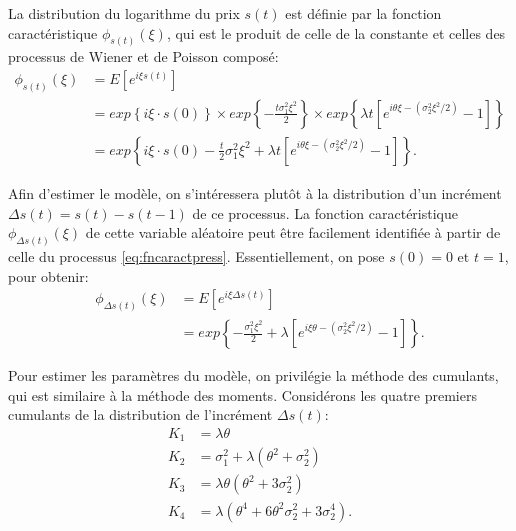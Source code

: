 La distribution du logarithme du prix $s(t)$ est définie par la
fonction caractéristique $\phi_{s(t)}(\xi)$, qui est le produit de
celle de la constante et celles des processus de Wiener et de Poisson
composé:
\begin{align}
  \label{eq:fncaractpress}
  \phi_{s(t)}\left(\xi\right) &= E\left[e^{i \xi s(t)} \right] \nonumber \\
  &= exp\left\{ i\xi \cdot s(0) \right\} \times exp \left\{ -\frac{t \sigma_1^2 \xi^2}{2} \right\} \times exp \left\{ \lambda t \left[e^{i \theta \xi-(\sigma_2^2 \xi^2/2)}-1 \right] \right\} \nonumber \\
  &= exp\left\{ i\xi \cdot s(0)- \frac{t}{2}\sigma_1^2\xi^2 + \lambda
    t \left[e^{i \theta \xi-(\sigma_2^2 \xi^2/2)}-1 \right] \right\}.
\end{align}

Afin d'estimer le modèle, on s'intéressera plutôt à la distribution
d'un incrément $\Delta s(t) = s(t)-s(t-1)$ de ce processus. La
fonction caractéristique $\phi_{\Delta s(t)}(\xi)$ de cette variable
aléatoire peut être facilement identifiée à partir de celle du
processus \eqref{eq:fncaractpress}. Essentiellement, on pose $s(0)=0
\mbox{ et } t=1$, pour obtenir:
\begin{align}
  \label{eq:fncaractpress2}
  \phi_{\Delta s(t)}\left(\xi\right) &= E\left[e^{i\xi\Delta s(t)} \right] \nonumber \\
  &= exp\left\{-\frac{\sigma_1^2 \xi^2}{2} + \lambda \left[e^{i
        \xi\theta -(\sigma_2^2 \xi^2/2)}-1 \right] \right\}.
\end{align}

Pour estimer les paramètres du modèle, on privilégie la méthode des
cumulants, qui est similaire à la méthode des moments. Considérons les
quatre premiers cumulants de la distribution de l'incrément $\Delta
s(t)$:
\begin{subequations}\label{eq:cumulantspress}
  \begin{align}
    K_1 &= \lambda\theta \\
    K_2 &= \sigma_1^2+\lambda(\theta^2+\sigma_2^2) \\
    K_3 &= \lambda\theta(\theta^2+3\sigma_2^2) \\
    K_4 &= \lambda(\theta^4 + 6 \theta^2 \sigma_2^2 + 3 \sigma_2^4).
  \end{align}
\end{subequations}

